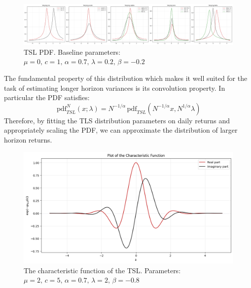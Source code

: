 \documentclass[11pt]{article}
\newcommand{\pdf}{\,\text{pdf}}
\begin{document}
        \begin{figure}[h!]
            \label{fig:parameters}
            \centering
            \includegraphics[width=0.9 \linewidth]{parameters}
            \caption{TSL PDF. Baseline parameters: $\mu=0, \,c=1,\, \alpha = 0.7, \, \lambda = 0.2,\, \beta =-0.2$}
        \end{figure}
        The fundamental property of this distribution which makes it well suited for the task of estimating longer horizon variances is its convolution property.
        In particular the PDF satisfies:
        \begin{equation}
            \pdf^N_{TSL}(x; \lambda) = N^{-1/\alpha} \pdf_{TSL}\left(  N^{-1/\alpha} x,  N^{1/\alpha}\lambda\right)\label{eq:scaling}
        \end{equation}
        Therefore, by fitting the TLS distribution parameters on daily returns and appropriately scaling the PDF, we can approximate the distribution of larger horizon returns.

        \begin{figure}[h!]
            \centering
            \includegraphics[width=0.6 \linewidth]{char_func}
            \caption{The characteristic function of the TSL. Parameters: $\mu=2, \,c=5,\, \alpha = 0.7, \, \lambda = 2,\, \beta =-0.8$}
            \label{fig:char_func}
        \end{figure}
\end{document}
